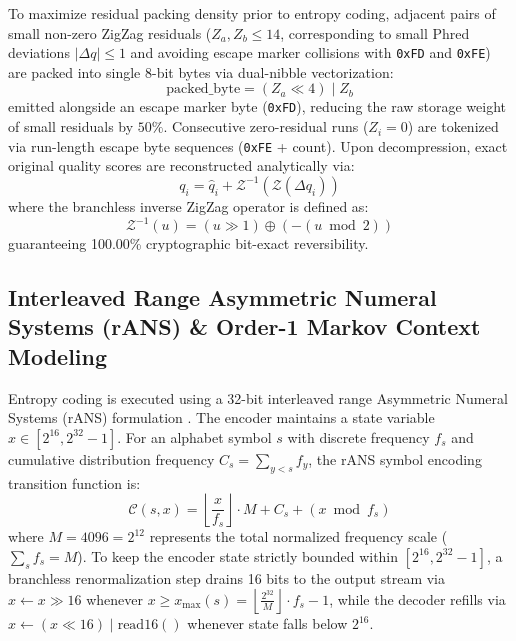 \documentclass[10pt,twocolumn,a4paper]{article}
\begin{document}
To maximize residual packing density prior to entropy coding, adjacent pairs of small non-zero ZigZag residuals ($Z_a, Z_b \le 14$, corresponding to small Phred deviations $|\Delta q| \le 1$ and avoiding escape marker collisions with \texttt{0xFD} and \texttt{0xFE}) are packed into single 8-bit bytes via dual-nibble vectorization:
\begin{equation}
\text{packed\_byte} = (Z_a \ll 4) \mid Z_b
\end{equation}
emitted alongside an escape marker byte (\texttt{0xFD}), reducing the raw storage weight of small residuals by $50\%$. Consecutive zero-residual runs ($Z_i = 0$) are tokenized via run-length escape byte sequences (\texttt{0xFE} + count). Upon decompression, exact original quality scores are reconstructed analytically via:
\begin{equation}
q_i = \hat{q}_i + \mathcal{Z}^{-1}(\mathcal{Z}(\Delta q_i))
\end{equation}
where the branchless inverse ZigZag operator is defined as:
\begin{equation}
\mathcal{Z}^{-1}(u) = (u \gg 1) \oplus (-(u \bmod 2))
\end{equation}
guaranteeing 100.00\% cryptographic bit-exact reversibility.

\subsection{Interleaved Range Asymmetric Numeral Systems (rANS) \& Order-1 Markov Context Modeling}
Entropy coding is executed using a 32-bit interleaved range Asymmetric Numeral Systems (rANS) formulation \cite{rans}. The encoder maintains a state variable $x \in [2^{16}, 2^{32}-1]$. For an alphabet symbol $s$ with discrete frequency $f_s$ and cumulative distribution frequency $C_s = \sum_{y < s} f_y$, the rANS symbol encoding transition function is:
\begin{equation}
\mathcal{C}(s, x) = \left\lfloor \frac{x}{f_s} \right\rfloor \cdot M + C_s + (x \bmod f_s)
\end{equation}
where $M = 4096 = 2^{12}$ represents the total normalized frequency scale ($\sum_s f_s = M$). To keep the encoder state strictly bounded within $[2^{16}, 2^{32}-1]$, a branchless renormalization step drains 16 bits to the output stream via $x \leftarrow x \gg 16$ whenever $x \ge x_{\max}(s) = \left\lfloor \frac{2^{32}}{M} \right\rfloor \cdot f_s - 1$, while the decoder refills via $x \leftarrow (x \ll 16) \mid \text{read16}()$ whenever state falls below $2^{16}$.
\end{document}
